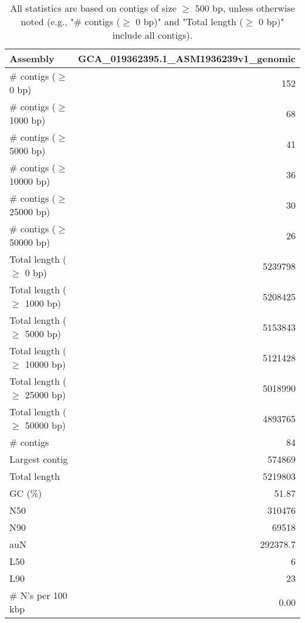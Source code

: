 \documentclass[12pt,a4paper]{article}
\begin{document}
\begin{table}[ht]
\begin{center}
\caption{All statistics are based on contigs of size $\geq$ 500 bp, unless otherwise noted (e.g., "\# contigs ($\geq$ 0 bp)" and "Total length ($\geq$ 0 bp)" include all contigs).}
\begin{tabular}{|l*{1}{|r}|}
\hline
Assembly & GCA\_019362395.1\_ASM1936239v1\_genomic \\ \hline
\# contigs ($\geq$ 0 bp) & 152 \\ \hline
\# contigs ($\geq$ 1000 bp) & 68 \\ \hline
\# contigs ($\geq$ 5000 bp) & 41 \\ \hline
\# contigs ($\geq$ 10000 bp) & 36 \\ \hline
\# contigs ($\geq$ 25000 bp) & 30 \\ \hline
\# contigs ($\geq$ 50000 bp) & 26 \\ \hline
Total length ($\geq$ 0 bp) & 5239798 \\ \hline
Total length ($\geq$ 1000 bp) & 5208425 \\ \hline
Total length ($\geq$ 5000 bp) & 5153843 \\ \hline
Total length ($\geq$ 10000 bp) & 5121428 \\ \hline
Total length ($\geq$ 25000 bp) & 5018990 \\ \hline
Total length ($\geq$ 50000 bp) & 4893765 \\ \hline
\# contigs & 84 \\ \hline
Largest contig & 574869 \\ \hline
Total length & 5219803 \\ \hline
GC (\%) & 51.87 \\ \hline
N50 & 310476 \\ \hline
N90 & 69518 \\ \hline
auN & 292378.7 \\ \hline
L50 & 6 \\ \hline
L90 & 23 \\ \hline
\# N's per 100 kbp & 0.00 \\ \hline
\end{tabular}
\end{center}
\end{table}
\end{document}
